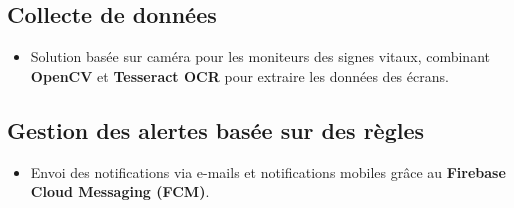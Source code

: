 \subsection{Collecte de données}
\begin{itemize}
    \item Solution basée sur caméra pour les moniteurs des signes vitaux, combinant \textbf{OpenCV} et \textbf{Tesseract OCR} pour extraire les données des écrans.
\end{itemize}

\subsection{Gestion des alertes basée sur des règles}
\begin{itemize}
    \item Envoi des notifications via e-mails et notifications mobiles grâce au \textbf{Firebase Cloud Messaging (FCM)}.
\end{itemize}
